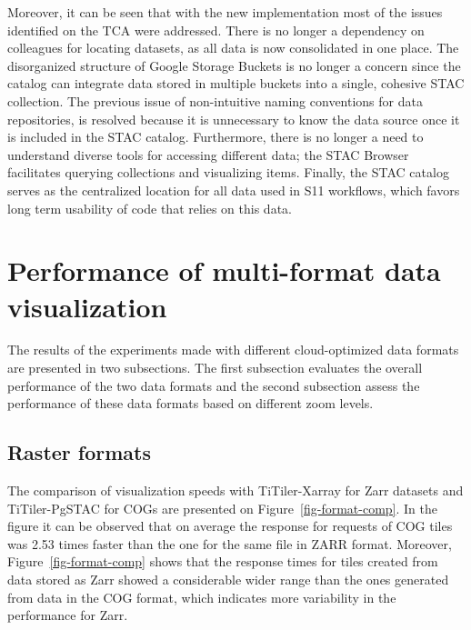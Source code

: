 \documentclass[
  oneside,
  open=any]{scrbook}
\begin{document}
Moreover, it can be seen that with the new implementation most of the
issues identified on the TCA were addressed. There is no longer a
dependency on colleagues for locating datasets, as all data is now
consolidated in one place. The disorganized structure of Google Storage
Buckets is no longer a concern since the catalog can integrate data
stored in multiple buckets into a single, cohesive STAC collection. The
previous issue of non-intuitive naming conventions for data
repositories, is resolved because it is unnecessary to know the data
source once it is included in the STAC catalog. Furthermore, there is no
longer a need to understand diverse tools for accessing different data;
the STAC Browser facilitates querying collections and visualizing items.
Finally, the STAC catalog serves as the centralized location for all
data used in S11 workflows, which favors long term usability of code
that relies on this data.

\section{Performance of multi-format data
visualization}\label{performance-of-multi-format-data-visualization}

The results of the experiments made with different cloud-optimized data
formats are presented in two subsections. The first subsection evaluates
the overall performance of the two data formats and the second
subsection assess the performance of these data formats based on
different zoom levels.

\subsection{Raster formats}\label{raster-formats}

The comparison of visualization speeds with TiTiler-Xarray for Zarr
datasets and TiTiler-PgSTAC for COGs are presented on
Figure~\ref{fig-format-comp}. In the figure it can be observed that on
average the response for requests of COG tiles was 2.53 times faster
than the one for the same file in ZARR format. Moreover,
Figure~\ref{fig-format-comp} shows that the response times for tiles
created from data stored as Zarr showed a considerable wider range than
the ones generated from data in the COG format, which indicates more
variability in the performance for Zarr.
\end{document}
